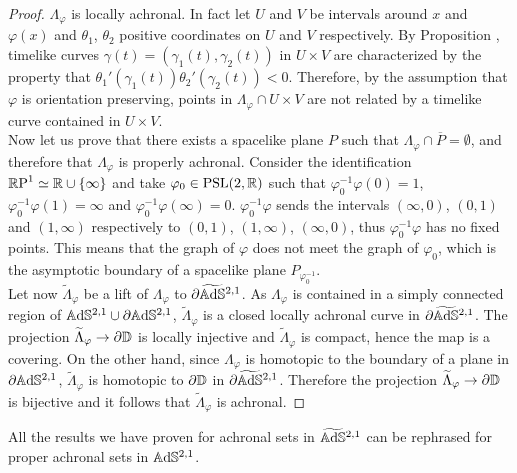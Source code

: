 \begin{proof}
    $\Lambda_\varphi$ is locally achronal. In fact let $U$ and $V$ be intervals around $x$ and $\varphi(x)$ and $\theta_1$, $\theta_2$ positive coordinates on $U$ and $V$ respectively. By Proposition , timelike curves $\gamma(t)=(\gamma_1(t),\gamma_2(t))$ in $U\times V$ are characterized by the property that $\theta_1'(\gamma_1(t))\theta_2'(\gamma_2(t)) < 0$. Therefore, by the assumption that $\varphi$ is orientation preserving, points in $\Lambda_\varphi \cap U\times V$ are not related by a timelike curve contained in $U \times V$.\\
    Now let us prove that there exists a spacelike plane $P$ such that $\Lambda_\varphi \cap \overline{P} = \emptyset$, and therefore that $\Lambda_\varphi$ is properly achronal. Consider the identification $\mathbb{R}\textup{P}^1 \simeq \mathbb{R} \cup \{ \infty \}$ and take $\varphi_0 \in \text{PSL}(2,\mathbb{R})$ such that $\varphi_0^{-1} \varphi (0) = 1$, $\varphi_0^{-1} \varphi (1) = \infty$ and $\varphi_0^{-1} \varphi (\infty) = 0$. $\varphi_0^{-1} \varphi$ sends the intervals $(\infty, 0)$, $(0,1)$ and $(1,\infty)$ respectively to $(0,1)$, $(1,\infty)$, $(\infty, 0)$, thus $\varphi_0^{-1} \varphi$ has no fixed points. This means that the graph of $\varphi$ does not meet the graph of $\varphi_0$, which is the asymptotic boundary of a spacelike plane $P_{\varphi_0^{-1}}$.\\
    Let now $\widetilde{\Lambda}_\varphi$ be a lift of $\Lambda_{\varphi}$ to $\partial\widetilde{\mathbb{A}\mathrm{d}\mathbb{S}}{}^{2,1}$. As $\Lambda_\varphi$ is contained in a simply connected region of $\mathbb{A}\mathrm{d}\mathbb{S}^{2,1} \cup \partial\mathbb{A}\mathrm{d}\mathbb{S}^{2,1}$, $\widetilde{\Lambda}_\varphi$ is a closed locally achronal curve in $\partial\widetilde{\mathbb{A}\mathrm{d}\mathbb{S}}{}^{2,1}$. The projection $\widetilde{\Lambda}_\varphi \to \partial\mathbb{D}$ is locally injective and $\widetilde{\Lambda}_\varphi$ is compact, hence the map is a covering. On the other hand, since $\Lambda_\varphi$ is homotopic to the boundary of a plane in $\partial\mathbb{A}\mathrm{d}\mathbb{S}^{2,1}$, $\widetilde{\Lambda}_\varphi$ is homotopic to $\partial\mathbb{D}$ in $\partial\widetilde{\mathbb{A}\mathrm{d}\mathbb{S}}{}^{2,1}$. Therefore the projection $\widetilde{\Lambda}_\varphi \to \partial\mathbb{D}$ is bijective and it follows that $\widetilde{\Lambda}_\varphi$ is achronal.
\end{proof}

\begin{observation}
    All the results we have proven for achronal sets in $\widetilde{\mathbb{A}\mathrm{d}\mathbb{S}}{}^{2,1}$ can be rephrased for proper achronal sets in $\mathbb{A}\mathrm{d}\mathbb{S}^{2,1}$.
\end{observation}

